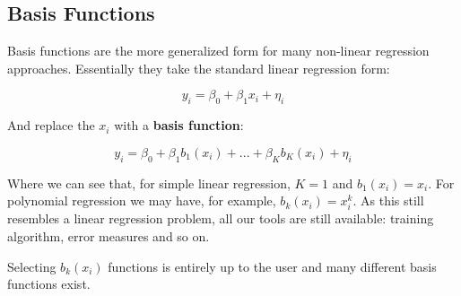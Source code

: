 \subsection{Basis Functions}

Basis functions are the more generalized form for many non-linear regression approaches. Essentially they take the standard linear regression form:

$$ y_{i} = \beta_{0} + \beta_{1}x_{i} + \eta_{i} $$

And replace the $x_{i}$ with a \textbf{basis function}:

$$ y_{i} = \beta_{0} + \beta_{1}b_{1}(x_{i}) + ... + \beta_{K}b_{K}(x_{i}) + \eta_{i} $$

Where we can see that, for simple linear regression, $K=1$ and $b_{1}(x_{i})=x_{i}$. For polynomial regression we may have, for example, $b_{k}(x_{i}) = x_{i}^{k}$. As this still resembles a linear regression problem, all our tools are still available: training algorithm, error measures and so on.

Selecting $b_{k}(x_{i})$ functions is entirely up to the user and many different basis functions exist.
